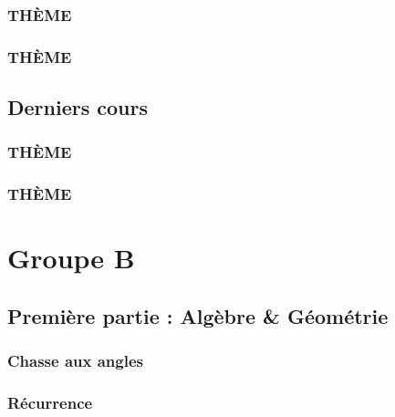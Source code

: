 \documentclass[poly,trombi]{valbonne}
\begin{document}

\subsection{THÈME}


\subsection{THÈME}



\section{Derniers cours}

\subsection{THÈME}


\subsection{THÈME}







\chapter{Groupe B}

\minitoc \clearpage

\section{Première partie : Algèbre \& Géométrie}

\subsection{Chasse aux angles}


\subsection{Récurrence}
\end{document}
